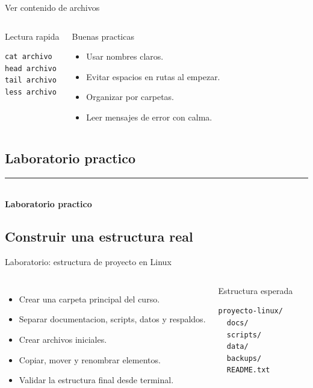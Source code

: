 \documentclass[aspectratio=169]{beamer}
\newcommand{\MainHeaderSlide}[2]{%
  \begin{frame}[plain]
    \hypertarget{#2}{}
    \vspace*{0.25\textheight}
    {\color{black}\rule{0.28\textwidth}{1.2pt}}\\[0.5em]
    {\usebeamerfont{title}\fontsize{34}{40}\selectfont\bfseries #1}
  \end{frame}
}
\begin{document}
\begin{frame}[fragile]{Ver contenido de archivos}
  \begin{columns}[t]
    \begin{block}{Lectura rapida}
\begin{verbatim}
cat archivo
head archivo
tail archivo
less archivo
\end{verbatim}
    \end{block}
    \begin{exampleblock}{Buenas practicas}
      \begin{itemize}
        \item Usar nombres claros.
        \item Evitar espacios en rutas al empezar.
        \item Organizar por carpetas.
        \item Leer mensajes de error con calma.
      \end{itemize}
    \end{exampleblock}
  \end{columns}
\end{frame}

\subsection{Laboratorio practico}
\MainHeaderSlide{Laboratorio practico}{idx-laboratorio-practico}

\subsection{Construir una estructura real}
\begin{frame}[fragile]{Laboratorio: estructura de proyecto en Linux}
  \begin{columns}[c]
    \begin{itemize}
      \item Crear una carpeta principal del curso.
      \item Separar documentacion, scripts, datos y respaldos.
      \item Crear archivos iniciales.
      \item Copiar, mover y renombrar elementos.
      \item Validar la estructura final desde terminal.
    \end{itemize}
    \footnotesize
    \begin{block}{Estructura esperada}
\begin{verbatim}
proyecto-linux/
  docs/
  scripts/
  data/
  backups/
  README.txt
\end{verbatim}
    \end{block}
  \end{columns}
\end{frame}
\end{document}
